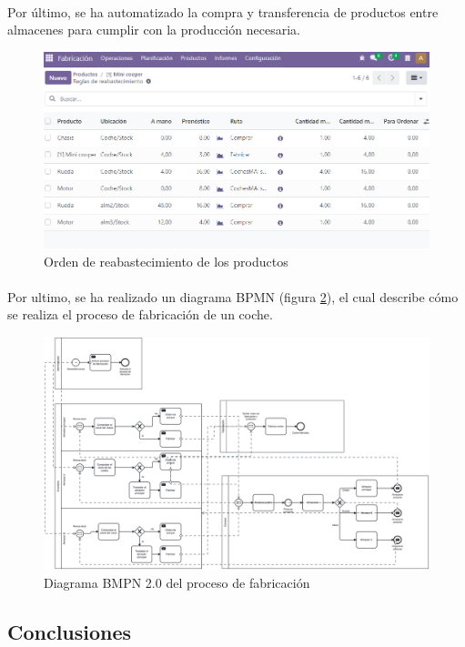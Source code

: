 \paragraph{}
Por último, se ha automatizado la compra y transferencia de productos entre almacenes para cumplir con la producción necesaria.
\begin{figure}[h]
    \centering
    \includegraphics[width=1\linewidth]{fotosGestFab/reabastecimiento.png}
    \caption{Orden de reabastecimiento de los productos}
    \label{fig:enter-label}
\end{figure}
\paragraph{}
Por ultimo, se ha realizado un diagrama BPMN (figura \ref{fab}), el cual describe cómo se realiza el proceso de fabricación de un coche.
\begin{figure}[h]
    \centering
    \includegraphics[width=1\linewidth]{fotosGestFab/Fabricacion.png}
    \caption{Diagrama BMPN 2.0 del proceso de fabricación}
    \label{fab}
\end{figure}
\subsection{Conclusiones}
